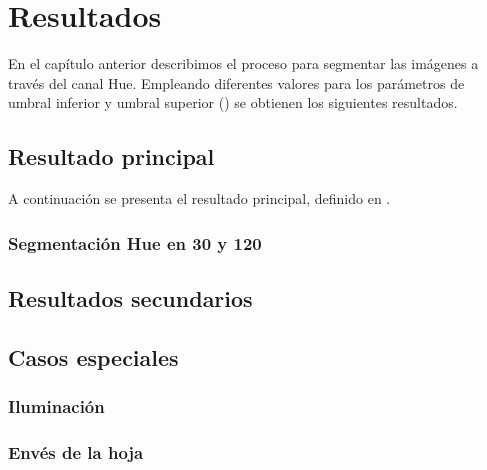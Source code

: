 \chapter{Resultados}
En el capítulo anterior describimos el proceso para segmentar las imágenes a través del canal Hue. Empleando diferentes valores para los parámetros de umbral inferior y umbral superior () se obtienen los siguientes resultados.

\section{Resultado principal}
A continuación se presenta el resultado principal, definido en .

\subsection{Segmentación Hue en 30 y 120}



\section{Resultados secundarios}

\section{Casos especiales}
\subsection{Iluminación}
\subsection{Envés de la hoja}
